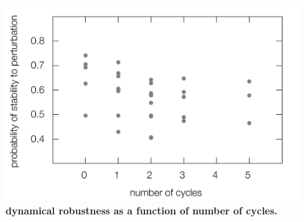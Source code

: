 \pagebreak
\FloatBarrier

\begin{figure}[!ht]
\centering
\noindent\includegraphics[width=0.6\columnwidth]{fig/cycle3x3.pdf}
\caption{{\bf dynamical robustness as a function of number of cycles.} }
\label{fig:cycle3x3}
\end{figure}





